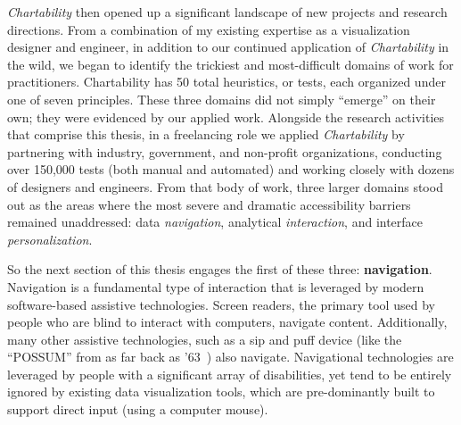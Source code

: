 \documentclass[12pt]{cmuthesis}
\begin{document}

\textit{Chartability} then opened up a significant landscape of new projects and research directions. From a combination of my existing expertise as a visualization designer and engineer, in addition to our continued application of \textit{Chartability} in the wild, we began to identify the trickiest and most-difficult domains of work for practitioners. Chartability has 50 total heuristics, or tests, each organized under one of seven principles. These three domains did not simply ``emerge'' on their own; they were evidenced by our applied work. Alongside the research activities that comprise this thesis, in a freelancing role we applied \textit{Chartability} by partnering with industry, government, and non-profit organizations, conducting over 150,000 tests (both manual and automated) and working closely with dozens of designers and engineers. From that body of work, three larger domains stood out as the areas where the most severe and dramatic accessibility barriers remained unaddressed: data \textit{navigation}, analytical \textit{interaction}, and interface \textit{personalization}.

So the next section of this thesis engages the first of these three: \textbf{navigation}. Navigation is a fundamental type of interaction that is leveraged by modern software-based assistive technologies. Screen readers, the primary tool used by people who are blind to interact with computers, navigate content. Additionally, many other assistive technologies, such as a sip and puff device (like the ``POSSUM'' from as far back as '63~\cite{Maling1963}) also navigate. Navigational technologies are leveraged by people with a significant array of disabilities, yet tend to be entirely ignored by existing data visualization tools, which are pre-dominantly built to support direct input (using a computer mouse).
\end{document}
